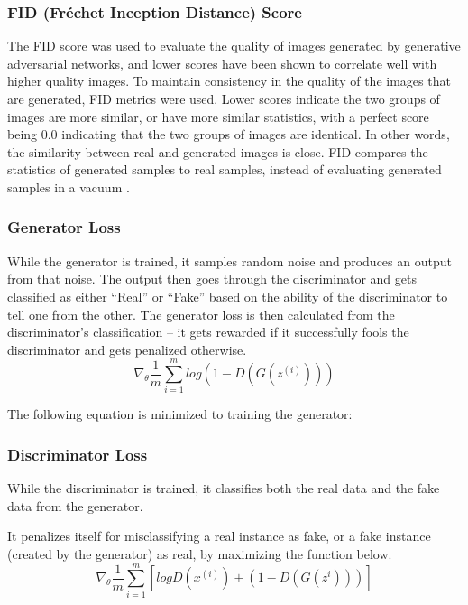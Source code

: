 \documentclass{article}
\begin{document}
\subsubsection{FID (Fréchet Inception Distance) Score } 

The FID score was used to evaluate the quality of images generated by generative adversarial networks, and lower scores have been shown to correlate well with higher quality images. To maintain consistency in the quality of the images that are generated, FID metrics were used. Lower scores indicate the two groups of images are more similar, or have more similar statistics, with a perfect score being 0.0 indicating that the two groups of images are identical. In other words, the similarity between real and generated images is close. FID compares the statistics of generated samples to real samples, instead of evaluating generated samples in a vacuum \cite{lucic2018gans}. 

\subsubsection{Generator Loss}

While the generator is trained, it samples random noise and produces an output from that noise. The output then goes through the discriminator and gets classified as either “Real” or “Fake” based on the ability of the discriminator to tell one from the other. The generator loss is then calculated from the discriminator’s classification – it gets rewarded if it successfully fools the discriminator and gets penalized otherwise.
\begin{equation}
    \nabla_\theta\frac{1}{m}\sum_{i=1}^{m}log\left( 1-D\left( G(z^{\left( i \right)}) \right) \right)
\end{equation}

The following equation is minimized to training the generator: 

\subsubsection{Discriminator Loss}

While the discriminator is trained, it classifies both the real data and the fake data from the generator. 

It penalizes itself for misclassifying a real instance as fake, or a fake instance (created by the generator) as real, by maximizing the function below. 
\begin{equation}
    \nabla_\theta\frac{1}{m}\sum_{i=1}^{m}\left[ logD\left( x^{\left( i \right)} \right)+\left( 1-D\left( G\left(z ^{i} \right) \right) \right) \right]
\end{equation}
\end{document}
